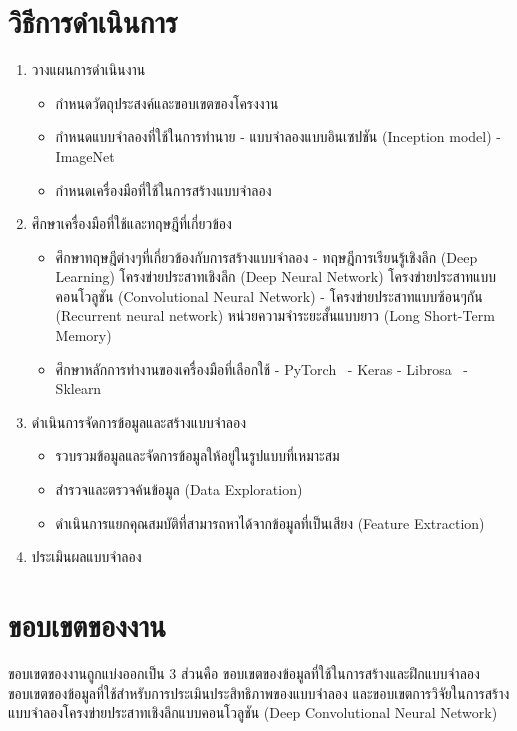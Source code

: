 \section{วิธีการดำเนินการ}
\begin{enumerate}
    \item วางแผนการดำเนินงาน
    \begin{itemize}
        \item กำหนดวัตถุประสงค์และขอบเขตของโครงงาน
        \item กำหนดแบบจำลองที่ใช้ในการทำนาย
        \subitem - แบบจำลองแบบอินเซปชัน (Inception model)
        \subitem - ImageNet~\cite{JiaDeng2009}
        \item กำหนดเครื่องมือที่ใช้ในการสร้างแบบจำลอง
    \end{itemize}
    \item ศึกษาเครื่องมือที่ใช้และทฤษฎีที่เกี่ยวข้อง
    \begin{itemize}
        \item ศึกษาทฤษฎีต่างๆที่เกี่ยวข้องกับการสร้างแบบจำลอง
        \subitem - ทฤษฎีการเรียนรู้เชิงลึก (Deep Learning) โครงข่ายประสาทเชิงลึก (Deep Neural Network) โครงข่ายประสาทแบบคอนโวลูชัน (Convolutional Neural Network)
        \subitem - โครงข่ายประสาทแบบซ้อนๆกัน (Recurrent neural network) หน่วยความจำระยะสั้นแบบยาว (Long Short-Term Memory)
        \item ศึกษาหลักการทำงานของเครื่องมือที่เลือกใช้
        \subitem - PyTorch~\cite{Pfeiffer1987}
        \subitem - Keras
        \subitem - Librosa~\cite{mcfee_librosa/librosa:_2020}
        \subitem - Sklearn
    \end{itemize}
    \item ดำเนินการจัดการข้อมูลและสร้างแบบจำลอง
    \begin{itemize}
        \item รวบรวมข้อมูลและจัดการข้อมูลให้อยู่ในรูปแบบที่เหมาะสม
        \item สำรวจและตรวจค้นข้อมูล (Data Exploration)
        \item ดำเนินการแยกคุณสมบัติที่สามารถหาได้จากข้อมูลที่เป็นเสียง (Feature Extraction)
    \end{itemize}
    \item ประเมินผลแบบจำลอง
\end{enumerate}

\section{ขอบเขตของงาน}
ขอบเขตของงานถูกแบ่งออกเป็น 3 ส่วนคือ ขอบเขตของข้อมูลที่ใช้ในการสร้างและฝึกแบบจำลอง ขอบเขตของข้อมูลที่ใช้สำหรับการประเมินประสิทธิภาพของแบบจำลอง 
และขอบเขตการวิจัยในการสร้างแบบจำลองโครงข่ายประสาทเชิงลึกแบบคอนโวลูชัน (Deep Convolutional Neural Network)


